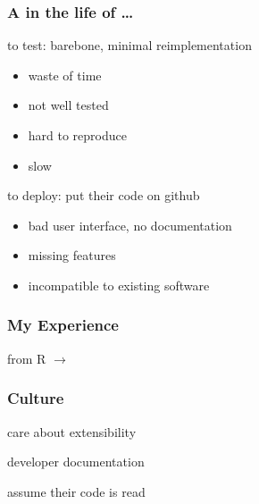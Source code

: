 \documentclass{beamer}
\newenvironment{wideitemize}{
    \itemize\addtolength{\itemsep}{15pt}\addtolength{\topsep}{10pt}}{\enditemize}
\begin{document}
    \begin{frame}
        \frametitle{A  in the life of \ldots}
        \vspace{0.8cm}
        \begin{wideitemize}
            \item<2-> to test: barebone, minimal reimplementation
            \begin{itemize}
                \item waste of time
                \item not well tested
                \item hard to reproduce
                \item slow
            \end{itemize}
            \item<3-> to deploy: put their code on github
            \begin{itemize}
                \item bad user interface, no documentation
                \item missing features
                \item incompatible to existing software
            \end{itemize}
        \end{wideitemize}
    \end{frame}

    \begin{frame}
        \frametitle{My Experience}
        \vspace{1cm}
        \begin{wideitemize}
            \item from R $\to$ 
        \end{wideitemize}
    \end{frame}

    \begin{frame}
        \frametitle{Culture}
        \vspace{0.8cm}
        \begin{wideitemize}
            \item care about extensibility
            \item developer documentation
            \item assume their code is read
        \end{wideitemize}
    \end{frame}
\end{document}
